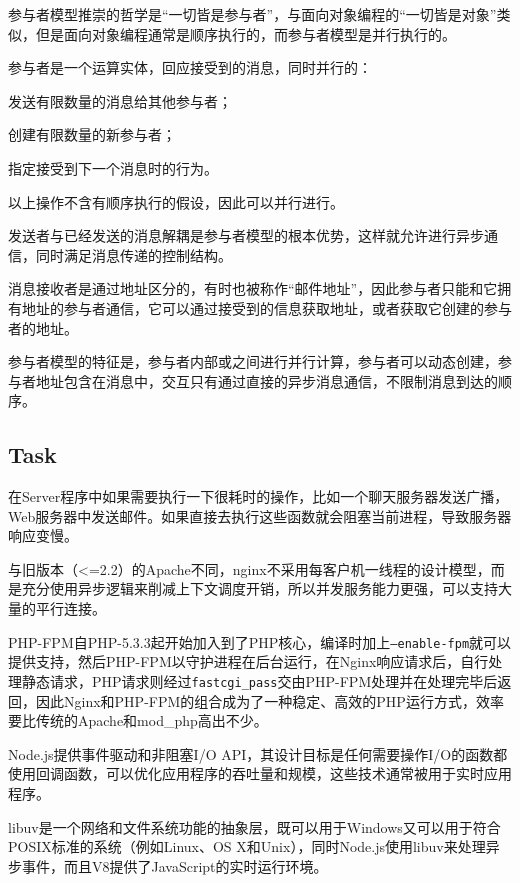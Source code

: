 参与者模型推崇的哲学是“一切皆是参与者”，与面向对象编程的“一切皆是对象”类似，但是面向对象编程通常是顺序执行的，而参与者模型是并行执行的。

参与者是一个运算实体，回应接受到的消息，同时并行的：

\begin{compactitem}
\item 发送有限数量的消息给其他参与者；
\item 创建有限数量的新参与者；
\item 指定接受到下一个消息时的行为。
\end{compactitem}

以上操作不含有顺序执行的假设，因此可以并行进行。

发送者与已经发送的消息解耦是参与者模型的根本优势，这样就允许进行异步通信，同时满足消息传递的控制结构。

消息接收者是通过地址区分的，有时也被称作“邮件地址”，因此参与者只能和它拥有地址的参与者通信，它可以通过接受到的信息获取地址，或者获取它创建的参与者的地址。

参与者模型的特征是，参与者内部或之间进行并行计算，参与者可以动态创建，参与者地址包含在消息中，交互只有通过直接的异步消息通信，不限制消息到达的顺序。



\subsection{Task}



在Server程序中如果需要执行一下很耗时的操作，比如一个聊天服务器发送广播，Web服务器中发送邮件。如果直接去执行这些函数就会阻塞当前进程，导致服务器响应变慢。

与旧版本（<=2.2）的Apache不同，nginx不采用每客户机一线程的设计模型，而是充分使用异步逻辑来削减上下文调度开销，所以并发服务能力更强，可以支持大量的平行连接。

PHP-FPM自PHP-5.3.3起开始加入到了PHP核心，编译时加上\texttt{--enable-fpm}就可以提供支持，然后PHP-FPM以守护进程在后台运行，在Nginx响应请求后，自行处理静态请求，PHP请求则经过\texttt{fastcgi\_pass}交由PHP-FPM处理并在处理完毕后返回，因此Nginx和PHP-FPM的组合成为了一种稳定、高效的PHP运行方式，效率要比传统的Apache和mod\_php高出不少。

Node.js提供事件驱动和非阻塞I/O API，其设计目标是任何需要操作I/O的函数都使用回调函数，可以优化应用程序的吞吐量和规模，这些技术通常被用于实时应用程序。

libuv是一个网络和文件系统功能的抽象层，既可以用于Windows又可以用于符合POSIX标准的系统（例如Linux、OS X和Unix），同时Node.js使用libuv来处理异步事件，而且V8提供了JavaScript的实时运行环境。

